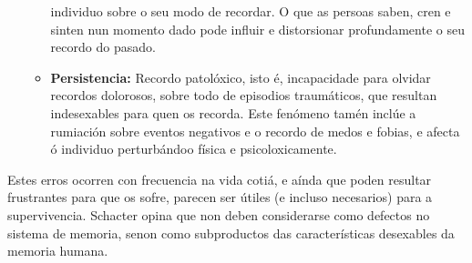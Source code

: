 \documentclass[a4paper,11pt]{article}
\begin{document}
\begin{itemize}
\begin{itemize}
		individuo sobre o seu modo de recordar. O que as persoas saben, cren e sinten nun momento
		dado pode influir e distorsionar profundamente o seu recordo do pasado.
		\item \textbf{Persistencia:} Recordo patolóxico, isto é, incapacidade para olvidar recordos
		dolorosos, sobre todo de episodios traumáticos, que resultan indesexables para quen os
		recorda. Este fenómeno tamén inclúe a rumiación sobre eventos negativos e o recordo de medos
		e fobias, e afecta ó individuo perturbándoo física e psicoloxicamente. 
	\end{itemize}
\end{itemize}

Estes erros ocorren con frecuencia na vida cotiá, e aínda que poden resultar frustrantes para que os sofre, parecen ser útiles (e incluso necesarios) para a supervivencia. Schacter opina que non deben considerarse como defectos no sistema de memoria, senon como subproductos das características desexables da memoria humana. 
\end{document}
